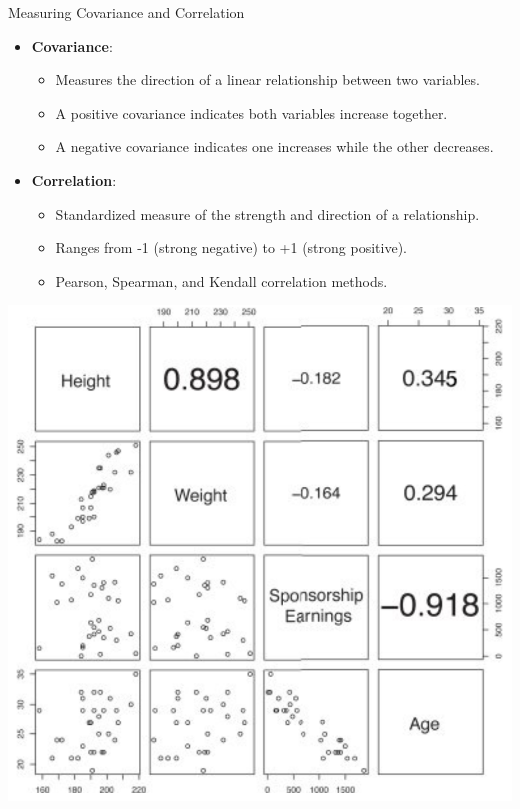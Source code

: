 \documentclass[aspectratio=169,xcolor=dvipsnames]{beamer}
\begin{document}
\begin{frame}{Measuring Covariance and Correlation}
\begin{itemize}
    \setlength\itemsep{0.25cm}
    \item \textbf{Covariance}:
    \begin{itemize}
        \item Measures the direction of a linear relationship between two variables.
        \item A positive covariance indicates both variables increase together.
        \item A negative covariance indicates one increases while the other decreases.
    \end{itemize}
    \item \textbf{Correlation}:
    \begin{itemize}
        \item Standardized measure of the strength and direction of a relationship.
        \item Ranges from -1 (strong negative) to +1 (strong positive).
        \item Pearson, Spearman, and Kendall correlation methods.
    \end{itemize}
\end{itemize}
\end{frame}
\begin{frame}
\centering
\includegraphics[scale=0.4]{images/cov_mat.png}
\end{frame}
\end{document}
